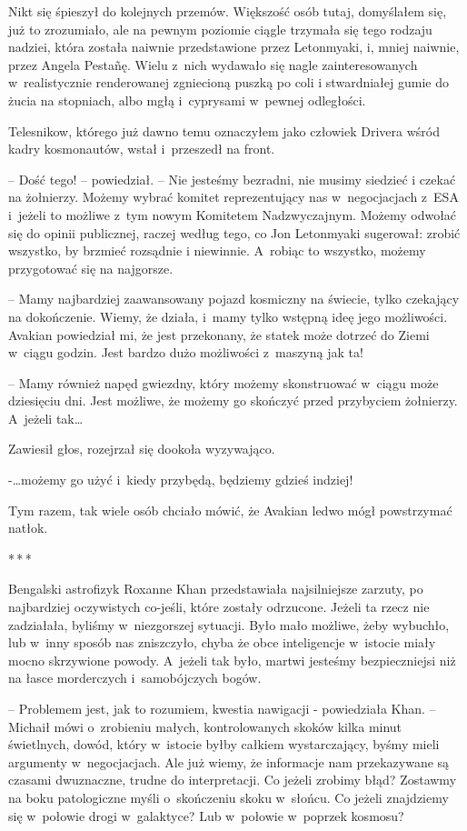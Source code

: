 \documentclass[oneside,polish,12pt,sfheadings]{mwbk}
\newcommand{\threeast}{\bigskip\par\centerline{*\,*\,*}\medskip\par}%
\begin{document}
Nikt się śpieszył do kolejnych przemów. Większość osób tutaj, domyślałem
się, już to zrozumiało, ale na pewnym poziomie ciągle trzymała się tego
rodzaju nadziei, która została naiwnie przedstawione przez Letonmyaki,
i, mniej naiwnie, przez Angela Pestañę. Wielu z~nich wydawało się nagle
zainteresowanych w~realistycznie renderowanej zgniecioną puszką po coli
i stwardniałej gumie do żucia na stopniach, albo mgłą i~cyprysami w~pewnej odległości.

Telesnikow, którego już dawno temu oznaczyłem jako człowiek Drivera
wśród kadry kosmonautów, wstał i~przeszedł na front.

-- Dość tego! -- powiedział. -- Nie jesteśmy bezradni, nie musimy siedzieć
i czekać na żołnierzy. Możemy wybrać komitet reprezentujący nas w~negocjacjach z~ESA i~jeżeli to możliwe z~tym nowym Komitetem
Nadzwyczajnym. Możemy odwołać się do opinii publicznej, raczej według
tego, co Jon Letonmyaki sugerował: zrobić wszystko, by brzmieć rozsądnie
i niewinnie. A~robiąc to wszystko, możemy przygotować się na najgorsze.

-- Mamy najbardziej zaawansowany pojazd kosmiczny na świecie, tylko
czekający na dokończenie. Wiemy, że działa, i~mamy tylko wstępną ideę
jego możliwości. Avakian powiedział mi, że jest przekonany, że statek
może dotrzeć do Ziemi w~ciągu godzin. Jest bardzo dużo możliwości z~maszyną jak ta!

-- Mamy również napęd gwiezdny, który możemy skonstruować w~ciągu może
dziesięciu dni. Jest możliwe, że możemy go skończyć przed przybyciem
żołnierzy. A~jeżeli tak\ldots

Zawiesił głos, rozejrzał się dookoła wyzywająco.

-\ldots możemy go użyć i~kiedy przybędą, będziemy gdzieś indziej!

Tym razem, tak wiele osób chciało mówić, że Avakian ledwo mógł
powstrzymać natłok.

\threeast

Bengalski astrofizyk Roxanne Khan przedstawiała najsilniejsze zarzuty,
po najbardziej oczywistych co-jeśli, które zostały odrzucone. Jeżeli ta
rzecz nie zadziałała, byliśmy w~niezgorszej sytuacji. Było mało możliwe,
żeby wybuchło, lub w~inny sposób nas zniszczyło, chyba że obce
inteligencje w~istocie miały mocno skrzywione powody. A~jeżeli tak było,
martwi jesteśmy bezpieczniejsi niż na łasce morderczych i~samobójczych
bogów. 

-- Problemem jest, jak to rozumiem, kwestia nawigacji -
powiedziała Khan. -- Michaił mówi o~zrobieniu małych, kontrolowanych
skoków kilka minut świetlnych, dowód, który w~istocie byłby całkiem
wystarczający, byśmy mieli argumenty w~negocjacjach. Ale już wiemy, że
informacje nam przekazywane są czasami dwuznaczne, trudne do
interpretacji. Co jeżeli zrobimy błąd? Zostawmy na boku patologiczne
myśli o~skończeniu skoku w~słońcu. Co jeżeli znajdziemy się w~połowie
drogi w~galaktyce? Lub w~połowie w~poprzek kosmosu?
\end{document}
